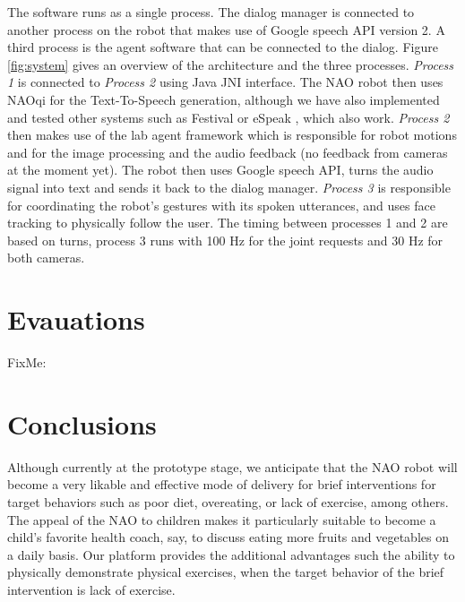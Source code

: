 \documentclass[letterpaper]{article}
\begin{document}
The software runs as a single process. The
dialog manager is connected to another process on the robot that makes use of Google speech API 
version 2. 
A third process is 
the agent software that can be connected to the dialog. Figure \ref{fig:system} gives an 
overview of the architecture and the three processes. {\em Process 1} is connected to {\em Process 2} using 
Java JNI interface.  The NAO robot then uses NAOqi for the Text-To-Speech 
generation, although we have also implemented and tested other systems such as Festival 
\cite{taylor1998architecture} or eSpeak \cite{eSpeak}, which  also work. {\em Process 2} then makes 
use of the lab agent framework which is responsible for robot motions and 
for the image processing and the audio feedback (no feedback from cameras at the moment yet). The 
robot then uses Google speech API, turns the audio signal into text and sends it back to the dialog 
manager. {\em Process 3} is responsible for coordinating the robot's gestures with its spoken utterances, and uses face tracking to physically follow the user.  The timing between processes 1 and 2 are based on turns, process 3 runs with 100 Hz for the 
joint requests and 30 Hz for both cameras.

\section*{Evauations}
FixMe:

\section*{Conclusions} 

Although currently at the prototype stage, we anticipate that the NAO robot will become a very 
likable and effective mode of delivery for brief interventions for target behaviors such as poor 
diet, overeating, or lack of exercise, among others.  The appeal of the NAO to children 
\cite{belpaeme2012multimodal} makes it particularly suitable to become a child's favorite health 
coach, say, to discuss eating more fruits and vegetables on a daily basis. Our platform 
provides the additional advantages such the ability to physically demonstrate physical exercises, when the target behavior of the brief intervention is lack of exercise.

       
   
\end{document}
